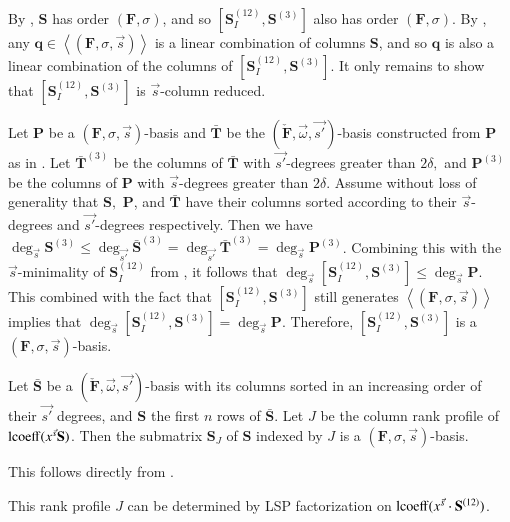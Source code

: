 \begin{pf}
By , $\mathbf{S}$ has order $\left(\mathbf{F},\sigma\right)$,
and so $[\mathbf{S}_{I}^{\left(12\right)},\mathbf{S}^{\left(3\right)}]$
also has order $\left(\mathbf{F},\sigma\right)$. By ,
any $\mathbf{q}\in\left\langle \left(\mathbf{F},\sigma,\vec{s}\right)\right\rangle $
is a linear combination of columns $\mathbf{S}$, and so $\mathbf{q}$
is also a linear combination of the columns of $[\mathbf{S}_{I}^{\left(12\right)},\mathbf{S}^{\left(3\right)}]$.
It only remains to show that $[\mathbf{S}_{I}^{\left(12\right)},\mathbf{S}^{\left(3\right)}]$
is $\vec{s}$-column reduced.

Let $\mathbf{P}$ be a $\left(\mathbf{F},\sigma,\vec{s}\right)$-basis
and $\mathbf{\bar{\mathbf{T}}}$ be the $(\check{\mathbf{F}},\vec{\omega},\vec{s'})$-basis
constructed from $\mathbf{P}$ as in . Let
$\bar{\mathbf{T}}^{\left(3\right)}$ be the columns of $\bar{\mathbf{T}}$
with $\vec{s'}$-degrees greater than $2\delta,$ and $\mathbf{P}^{\left(3\right)}$
be the columns of $\mathbf{P}$ with $\vec{s}$-degrees greater than
$2\delta.$ Assume without loss of generality that $\mathbf{S},$
$\mathbf{P}$, and $\bar{\mathbf{T}}$ have their columns sorted according
to their $\vec{s}$-degrees and $\vec{s'}$-degrees respectively.
Then we have $\deg_{\vec{s}}\mathbf{S}^{\left(3\right)}\le\deg_{\vec{s'}}\bar{\mathbf{S}}^{\left(3\right)}=\deg_{\vec{s'}}\bar{\mathbf{T}}^{\left(3\right)}=\deg_{\vec{s}}\mathbf{P}^{\left(3\right)}$.
Combining this with the $\vec{s}$-minimality of $\mathbf{S}_{I}^{\left(12\right)}$
from , it follows that $\deg_{\vec{s}}[\mathbf{S}_{I}^{\left(12\right)},\mathbf{S}^{\left(3\right)}]\le\deg_{\vec{s}}\mathbf{P}$.
This combined with the fact that $[\mathbf{S}_{I}^{\left(12\right)},\mathbf{S}^{\left(3\right)}]$
still generates $\left\langle \left(\mathbf{F},\sigma,\vec{s}\right)\right\rangle $
implies that $\deg_{\vec{s}}[\mathbf{S}_{I}^{\left(12\right)},\mathbf{S}^{\left(3\right)}]=\deg_{\vec{s}}\mathbf{P}$.
Therefore, $[\mathbf{S}_{I}^{\left(12\right)},\mathbf{S}^{\left(3\right)}]$
is a $\left(\mathbf{F},\sigma,\vec{s}\right)$-basis. \end{pf}
\begin{cor}
\label{cor:extractingFbasisFromGbasis}Let $\bar{\mathbf{S}}$ be
a $(\check{\mathbf{F}},\vec{\omega},\vec{s'})$-basis with its columns
sorted in an increasing order of their $\vec{s'}$ degrees, and $\mathbf{S}$
the first $n$ rows of $\bar{\mathbf{S}}$. Let $J$ be the column
rank profile of $\operatorname{lcoeff}(x^{\vec{s}}\mathbf{S})$. Then the submatrix
$\mathbf{S}_{J}$ of $\mathbf{S}$ indexed by $J$ is a $\left(\mathbf{F},\sigma,\vec{s}\right)$-basis.\end{cor}
\begin{pf}
This follows directly from . 
\end{pf}
This rank profile $J$ can be determined by LSP factorization on $\operatorname{lcoeff}(x^{\vec{s}}\cdot\mathbf{S}^{\left(12\right)})$.

